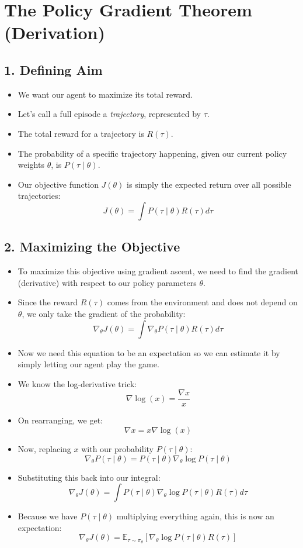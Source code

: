 \documentclass[12pt]{article}
\begin{document}
\section*{The Policy Gradient Theorem (Derivation)}

\subsection*{1. Defining Aim}
\begin{itemize}[label=$\bullet$]
    \item We want our agent to maximize its total reward.
    \item Let's call a full episode a \textit{trajectory}, represented by $\tau$. 
    \item The total reward for a trajectory is $R(\tau)$.
    \item The probability of a specific trajectory happening, given our current policy weights $\theta$, is $P(\tau \mid \theta)$.
    \item Our objective function $J(\theta)$ is simply the expected return over all possible trajectories:
    $$J(\theta) = \int P(\tau \mid \theta) R(\tau) d\tau$$
\end{itemize}

\subsection*{2. Maximizing the Objective}
\begin{itemize}[label=$\bullet$]
    \item To maximize this objective using gradient ascent, we need to find the gradient (derivative) with respect to our policy parameters $\theta$.
    \item Since the reward $R(\tau)$ comes from the environment and does not depend on $\theta$, we only take the gradient of the probability:
    $$\nabla_\theta J(\theta) = \int \nabla_\theta P(\tau \mid \theta) R(\tau) d\tau$$
    \item Now we need this equation to be an expectation so we can estimate it by simply letting our agent play the game.
    \item We know the log-derivative trick:
    $$\nabla \log(x) = \frac{\nabla x}{x}$$
    \item On rearranging, we get:
    $$\nabla x = x \nabla \log(x)$$
    \item Now, replacing $x$ with our probability $P(\tau \mid \theta)$:
    $$\nabla_\theta P(\tau \mid \theta) = P(\tau \mid \theta) \nabla_\theta \log P(\tau \mid \theta)$$
    \item Substituting this back into our integral:
    $$\nabla_\theta J(\theta) = \int P(\tau \mid \theta) \nabla_\theta \log P(\tau \mid \theta) R(\tau) d\tau$$
    \item Because we have $P(\tau \mid \theta)$ multiplying everything again, this is now an expectation:
    $$\nabla_\theta J(\theta) = \mathbb{E}_{\tau \sim \pi_\theta} \left[ \nabla_\theta \log P(\tau \mid \theta) R(\tau) \right]$$
\end{itemize}
\end{document}
